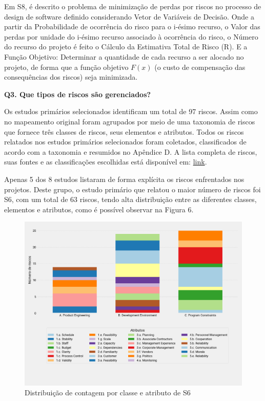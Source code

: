 \documentclass[
	12pt,
	openright,
	twoside,
	a4paper,
	english,
	brazil
	]{abntex2}
\begin{document}
Em S8, é descrito o problema de minimização de perdas por riscos no processo de design de software definido considerando Vetor de Variáveis de Decisão. Onde a partir da Probabilidade de ocorrência do risco para o i-ésimo recurso, o Valor das perdas por unidade do i-ésimo recurso associado à ocorrência do risco, o Número do recurso do projeto é feito o Cálculo da Estimativa Total de Risco (R). E a Função Objetivo: Determinar a quantidade de cada recurso a ser alocado no projeto, de forma que a função objetivo  \( F(x) \) (o custo de compensação das consequências dos riscos) seja minimizada.

\textbf{Q3. Que tipos de riscos são gerenciados?}

Os estudos primários selecionados identificam um total de 97 riscos. Assim como no mapeamento original foram agrupados por meio de uma taxonomia de riscos que fornece três classes de riscos, seus elementos e atributos. Todos os riscos relatados nos estudos primários selecionados foram coletados, classificados de acordo com a taxonomia e resumidos no Apêndice D. A lista completa de riscos, suas fontes e as classificações escolhidas está disponível em: \href{https://docs.google.com/spreadsheets/d/1YY_yjyBefJ3ZmnEY38TM_LnZLoJcKhrw_q0BdEvqx2E/edit?usp=drivesdk}{link}.

Apenas 5 dos 8 estudos listaram de forma explícita os riscos enfrentados nos projetos. Deste grupo, o estudo primário que relatou o maior número de riscos foi S6, com um total de 63 riscos, tendo alta distribuição entre as diferentes classes, elementos e atributos, como é possível observar na Figura 6.

\begin{figure}[H]
	\caption{\label{dist-contagem-classe-atributo}Distribuição de contagem por classe e atributo de S6}
  \includegraphics[width=\textwidth]{dist-contagem-classe-atributo}
\end{figure}
\end{document}
